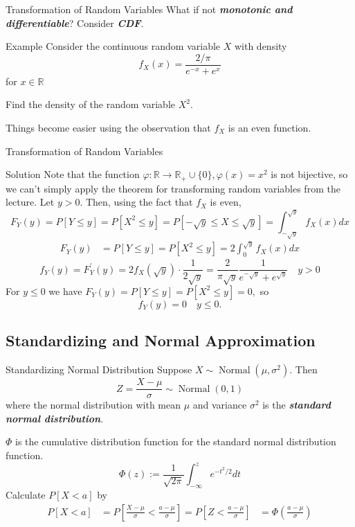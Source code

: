 \documentclass{beamer}
\newcommand{\bb}[1]{\textcolor{antiquefuchsia}{\textbf{\textit{#1}}}}
\begin{document}
\begin{frame}{Transformation of Random Variables}
What if not \bb{monotonic and differentiable}? Consider \bb{CDF}.
\begin{block}{Example}
Consider the continuous random variable $X$ with density
$$
f_{X}(x)=\frac{2/\pi}{e^{-x}+e^{x}}
$$
for $x \in \mathbb{R}$

Find the density of the random variable $X^{2}$.
\end{block}
Things become easier using the observation that $f_X$ is an even function.
\end{frame}

\begin{frame}{Transformation of Random Variables}
\begin{block}{Solution}
Note that the function $\varphi: \mathbb{R} \rightarrow \mathbb{R}_{+} \cup\{0\}, \varphi(x)=x^{2}$ is not bijective, so we can't simply apply the theorem for transforming random variables from the lecture. Let $y>0$. Then, using the fact that $f_{X}$ is even,
$$
F_{Y}(y)=P[Y \leq y]=P\left[X^{2} \leq y\right]=P[-\sqrt{y} \leq X \leq \sqrt{y}]=\int_{-\sqrt{y}}^{\sqrt{y}} f_{X}(x) d x
$$
$$
\begin{aligned}
F_{Y}(y) &=P[Y \leq y]=P\left[X^{2} \leq y\right]=2 \int_{0}^{\sqrt{y}} f_{X}(x) d x
\end{aligned}
$$
$$
f_{Y}(y)=F_{Y}^{\prime}(y)=2 f_{X}(\sqrt{y}) \cdot \frac{1}{2 \sqrt{y}}=\frac{2}{\pi \sqrt{y}} \frac{1}{e^{-\sqrt{y}}+e^{\sqrt{y}}}\quad  y>0
$$
For $y \leq 0$ we have
$
F_{Y}(y)=P[Y \leq y]=P\left[X^{2} \leq y\right]=0,
$
so $$f_{Y}(y)=0 \quad y \leq 0 .$$
\end{block}
\end{frame}



\subsection{Standardizing and Normal Approximation}
\begin{frame}{Standardizing Normal Distribution}
Suppose $X \sim \operatorname{Normal}\left(\mu, \sigma^{2}\right) .$ Then
$$
Z=\frac{X-\mu}{\sigma} \sim \operatorname{Normal}(0,1)
$$
where the normal distribution with mean $\mu$ and variance $\sigma^{2}$ is the \bb{standard normal distribution}.

$\Phi$ is the cumulative distribution function for the standard normal distribution function.
$$
\Phi(z):=\frac{1}{\sqrt{2 \pi}} \int_{-\infty}^{z} e^{-t^{2} / 2} d t
$$
Calculate $P[X<a]$ by
$$
\begin{aligned}
P[X<a] &=P\left[\frac{X-\mu}{\sigma}<\frac{a-\mu}{\sigma}\right] =P\left[Z<\frac{a-\mu}{\sigma}\right] &=\Phi\left(\frac{a-\mu}{\sigma}\right)
\end{aligned}
$$
\end{frame}
\end{document}
